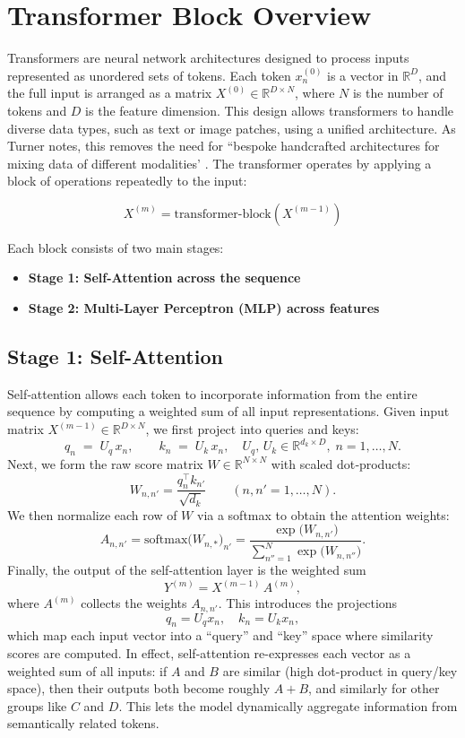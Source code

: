 \documentclass{article}
\begin{document}
\section{Transformer Block Overview}

Transformers are neural network architectures designed to process inputs represented as unordered sets of tokens. Each token \( x_n^{(0)} \) is a vector in \( \mathbb{R}^D \), and the full input is arranged as a matrix \( X^{(0)} \in \mathbb{R}^{D \times N} \), where \( N \) is the number of tokens and \( D \) is the feature dimension. This design allows transformers to handle diverse data types, such as text or image patches, using a unified architecture. As Turner notes, this removes the need for ``bespoke handcrafted architectures for mixing data of different modalities' \cite{turner2024introductiontransformers}. The transformer operates by applying a block of operations repeatedly to the input:

\[
X^{(m)} = \text{transformer-block}(X^{(m-1)})
\]

Each block consists of two main stages:
\begin{itemize}
  \item \textbf{Stage 1: Self-Attention across the sequence}
  \item \textbf{Stage 2: Multi-Layer Perceptron (MLP) across features}
\end{itemize}

\subsection{Stage 1: Self-Attention}

Self‐attention allows each token to incorporate information from the entire sequence by computing a weighted sum of all input representations.  Given input matrix \(X^{(m-1)}\in\mathbb{R}^{D\times N}\), we first project into queries and keys:
\[
q_n \;=\; U_q\,x_n,\qquad
k_n \;=\; U_k\,x_n,
\quad
U_q,\,U_k\in\mathbb{R}^{d_k\times D},\;n=1,\dots,N.
\]
Next, we form the raw score matrix \(W\in\mathbb{R}^{N\times N}\) with scaled dot‐products:
\[
W_{n,n'}
=\frac{q_n^{\!\top}k_{n'}}{\sqrt{d_k}}
\qquad
(n,n'=1,\dots,N).
\]
We then normalize each row of \(W\) via a softmax to obtain the attention weights:
\[
A_{n,n'}
=\mathrm{softmax}\bigl(W_{n,\ast}\bigr)_{n'}
=\frac{\exp\bigl(W_{n,n'}\bigr)}
      {\sum_{n''=1}^N\exp\bigl(W_{n,n''}\bigr)}.
\]
Finally, the output of the self‐attention layer is the weighted sum
\[
Y^{(m)}
= X^{(m-1)}\,A^{(m)},
\]
where \(A^{(m)}\) collects the weights \(A_{n,n'}\).  
This introduces the projections 
\[
q_n = U_q x_n,\quad k_n = U_k x_n,
\]
which map each input vector into a “query” and “key” space where similarity scores are computed.  In effect, self-attention re-expresses each vector as a weighted sum of all inputs: if \(A\) and \(B\) are similar (high dot-product in query/key space), then their outputs both become roughly \(A+B\), and similarly for other groups like \(C\) and \(D\).  This lets the model dynamically aggregate information from semantically related tokens.
\end{document}
